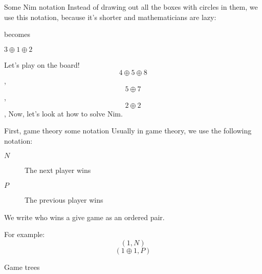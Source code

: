 	\begin{namedframe}{Some Nim notation}
		Instead of drawing out all the boxes with circles in them, we use this notation, because it's shorter and mathematicians are lazy:
		\begin{center}

			becomes

			$3 \oplus 1 \oplus 2$
		\end{center}
	\end{namedframe}
	\begin{namedframe}{Let's play on the board!}
		\[4 \oplus 5 \oplus 8\]
		\sep
		\[5 \oplus 7\]
		\sep
		\[2 \oplus 2\]
		\sep
		Now, let's look at how to solve Nim.
	\end{namedframe}
	\begin{namedframe}{First, game theory some notation}
		Usually in game theory, we use the following notation:
		\begin{description}
			\item[$N$] The next player wins
			\item[$P$] The previous player wins
		\end{description}
		We write who wins a give game as an ordered pair.

		For example:
		\[(1,N)\]
		\[(1 \oplus 1,P)\]
	\end{namedframe}
	\begin{namedframe}{Game trees}
		\centering
		\only<1>{
			\begin{forest}
				[{$(2 \oplus 2, ?)$}
					[]
					[]
				]
			\end{forest}
		}
		\only<2>{
			\begin{forest}
				[{$(2 \oplus 2, ?)$}
					[{$(1 \oplus 2, ?)$}
						[{$(1 \oplus 1, ?)$}
							[{$(1, ?)$}]
						]
						[{$(2, ?)$}]
						[{$(1, ?)$}]
					]
					[{$(2, ?)$}]
				]
			\end{forest}
		}
		\only<3>{
			\begin{forest}
				[{$(2 \oplus 2, ?)$}
					[{$(1 \oplus 2, ?)$}
						[{$(1 \oplus 1, ?)$}
							[{$(1, N)$}]
						]
						[{$(2, N)$}]
						[{$(1, N)$}]
					]
					[{$(2, N)$}]
				]
			\end{forest}
		}
		\only<4>{
			\begin{forest}
				[{$(2 \oplus 2, P)$}
					[{$(1 \oplus 2, N)$}
						[{$(1 \oplus 1, P)$}
							[{$(1, N)$}]
						]
						[{$(2, N)$}]
						[{$(1, N)$}]
					]
					[{$(2, N)$}]
				]
			\end{forest}
		}
	\end{namedframe}
